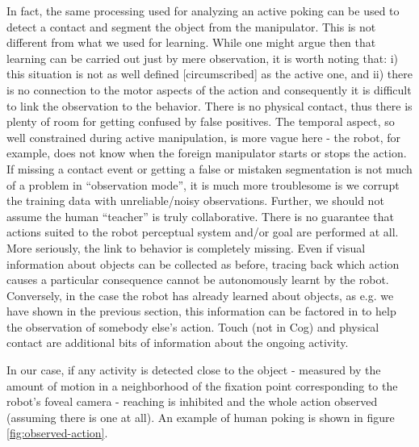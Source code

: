 In fact, the same processing used for analyzing an active poking 
can be used to detect a contact and segment the object from the manipulator.
This is not different from what we used for learning. While one might argue then
that learning can be carried out just by mere observation, it is
worth noting that: i) this situation is not as well defined [circumscribed] 
as the active one, and ii) there is no connection to the motor aspects 
of the action and consequently it is difficult to link the observation to the behavior.
There is no physical contact, thus there is plenty of room for getting confused 
by false positives. The temporal aspect, so well constrained during active manipulation, is 
more vague here - the robot, for example, does not know when the foreign manipulator starts
or stops the action. If missing a contact event or getting a false or mistaken 
segmentation is not much of a problem in ``observation mode'', it is much more
troublesome is we corrupt the training data with unreliable/noisy observations.
Further, we should not assume the human ``teacher'' is truly collaborative. 
There is no guarantee that actions suited to the robot perceptual system and/or 
goal are performed at all.
More seriously, the link to behavior is completely missing. Even if visual 
information about objects can be collected as before, tracing back which action
causes a particular consequence cannot be autonomously learnt by the robot.
Conversely, in the case the robot has already learned about objects, 
as e.g. we have shown in the previous section, this information can be
factored in to help the observation of somebody else's action. Touch 
(not in Cog) and physical contact are additional bits of information 
about the ongoing activity.

In our case, if any activity is detected close to the object - measured by the 
amount of motion in a neighborhood of the fixation point corresponding to the robot's foveal 
camera - reaching is inhibited and the whole action observed (assuming there 
is one at all). An example of human poking is shown in figure \ref{fig:observed-action}.

